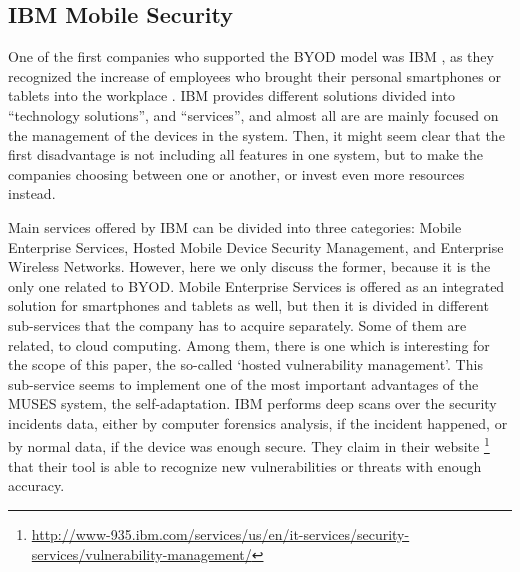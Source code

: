 
\subsection{IBM Mobile Security}
\label{subsec:ibm}

One of the first companies who supported the BYOD model was IBM \cite{IBM_tool}, as they recognized the increase of employees who brought their personal smartphones or tablets into the workplace \cite{ibm11}. IBM provides different solutions divided into ``technology solutions'', and ``services'', and almost all are are mainly focused on the management of the devices in the system. Then, it might seem clear that the first disadvantage is not including all features in one system, but to make the companies choosing between one or another, or invest even more resources instead.

Main services offered by IBM can be divided into three categories: Mobile Enterprise Services, Hosted Mobile Device Security Management, and Enterprise Wireless Networks. However, here we only discuss the former, because it is the only one related to BYOD. Mobile Enterprise Services is offered as an integrated solution for smartphones and tablets as well, but then it is divided in different sub-services that the company has to acquire separately. Some of them are related, to cloud computing. Among them, there is one which is interesting for the scope of this paper, the so-called `hosted vulnerability management'. This sub-service seems to implement one of the most important advantages of the MUSES system, the self-adaptation. IBM performs deep scans over the security incidents data, either by computer forensics analysis, if the incident happened, or by normal data, if the device was enough secure. They claim in their website \footnote{\url{http://www-935.ibm.com/services/us/en/it-services/security-services/vulnerability-management/}} that their tool is able to recognize new vulnerabilities or threats with enough accuracy. 


